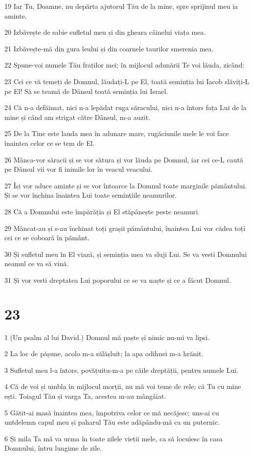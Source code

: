 \par 19 Iar Tu, Doamne, nu depărta ajutorul Tău de la mine, spre sprijinul meu ia aminte.
\par 20 Izbăvește de sabie sufletul meu și din gheara câinelui viața mea.
\par 21 Izbăvește-mă din gura leului și din coarnele taurilor smerenia mea.
\par 22 Spune-voi numele Tău fraților mei; în mijlocul adunării Te voi lăuda, zicând:
\par 23 Cei ce vă temeți de Domnul, lăudați-L pe El, toată seminția lui Iacob slăviți-L pe El! Să se teamă de Dânsul toată seminția lui Israel.
\par 24 Că n-a defăimat, nici n-a lepădat ruga săracului, nici n-a întors fața Lui de la mine și când am strigat către Dânsul, m-a auzit.
\par 25 De la Tine este lauda mea în adunare mare, rugăciunile mele le voi face înaintea celor ce se tem de El.
\par 26 Mânca-vor săracii și se vor sătura și vor lăuda pe Domnul, iar cei ce-L caută pe Dânsul vii vor fi inimile lor în veacul veacului.
\par 27 Își vor aduce aminte și se vor întoarce la Domnul toate marginile pământului. Și se vor închina înaintea Lui toate semințiile neamurilor.
\par 28 Că a Domnului este împărăția și El stăpânește peste neamuri.
\par 29 Mâncat-au și s-au închinat toți grașii pământului, înaintea Lui vor cădea toți cei ce se coboară în pământ.
\par 30 Și sufletul meu în El viază, și seminția mea va sluji Lui. Se va vesti Domnului neamul ce va să vină.
\par 31 Și vor vesti dreptatea Lui poporului ce se va naște și ce a făcut Domnul.

\chapter{23}

\par 1 (Un psalm al lui David.) Domnul mă paște și nimic nu-mi va lipsi.
\par 2 La loc de pășune, acolo m-a sălășluit; la apa odihnei m-a hrănit.
\par 3 Sufletul meu l-a întors, povățuitu-m-a pe căile dreptății, pentru numele Lui.
\par 4 Că de voi și umbla în mijlocul morții, nu mă voi teme de rele; că Tu cu mine ești. Toiagul Tău și varga Ta, acestea m-au mângâiat.
\par 5 Gătit-ai masă înaintea mea, împotriva celor ce mă necăjesc; uns-ai cu untdelemn capul meu și paharul Tău este adăpându-mă ca un puternic.
\par 6 Și mila Ta mă va urma în toate zilele vieții mele, ca să locuiesc în casa Domnului, întru lungime de zile.

